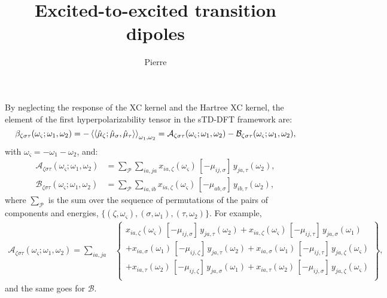 \documentclass[11pt,a4paper]{article}
\title{Excited-to-excited transition dipoles}
\author{Pierre}
\begin{document}
\maketitle

By neglecting the response of the XC kernel and the Hartree XC kernel, the element of the first hyperpolarizability tensor in the sTD-DFT framework are:
\begin{equation}
\beta_{\zeta\sigma\tau}(\omega_\varsigma;\omega_1,\omega_2) = -\braket{\braket{\hat\mu_\zeta;\hat\mu_\sigma,\hat\mu_\tau}}_{\omega_1,\omega_2} = \mathcal A_{\zeta\sigma\tau}(\omega_\varsigma;\omega_1,\omega_2) - \mathcal B_{\zeta\sigma\tau}(\omega_\varsigma;\omega_1,\omega_2), \label{eq:beta}
\end{equation}
with $\omega_\varsigma = -\omega_1 - \omega_2$, and:
\begin{align}
	\mathcal A_{\zeta\sigma\tau}(\omega_\varsigma;\omega_1,\omega_2) &= \sum_{\mathcal P} \sum_{ia,ja} x_{ia,\zeta}(\omega_\varsigma)\,[-\mu_{ij,\sigma}]\,y_{ja,\tau}(\omega_2), \label{eq:A}\\
	\mathcal B_{\zeta\sigma\tau}(\omega_\varsigma;\omega_1,\omega_2) &= \sum_{\mathcal P} \sum_{ia,ib} x_{ia,\zeta}(\omega_\varsigma)\,[-\mu_{ab,\sigma}]\,y_{ib,\tau}(\omega_2), \label{eq:B}
\end{align}
where $\sum_{\mathcal P}$ is the sum over the sequence of permutations of the pairs of components and energies, $\{(\zeta,\omega_\varsigma), (\sigma, \omega_1), (\tau,\omega_2)\}$. For example,
	\begin{align*}
	\mathcal A_{\zeta\sigma\tau}(\omega_\varsigma;\omega_1,\omega_2) = \sum_{ia,ja}& \left\{\begin{array}{l}
		x_{ia,\zeta}(\omega_\varsigma)\,[-\mu_{ij,\sigma}]\,y_{ja,\tau}(\omega_2) + x_{ia,\zeta}(\omega_\varsigma)\,[-\mu_{ij,\tau}]\,y_{ja,\sigma}(\omega_1)\\
		+x_{ia,\sigma}(\omega_1)\,[-\mu_{ij,\zeta}]\,y_{ja,\tau}(\omega_2) + x_{ia,\sigma}(\omega_1)\,[-\mu_{ij,\tau}]\,y_{ja,\zeta}(\omega_\varsigma) \\
		+x_{ia,\tau}(\omega_2)\,[-\mu_{ij,\zeta}]\,y_{ja,\sigma}(\omega_1) + x_{ia,\tau}(\omega_2)\,[-\mu_{ij,\sigma}]\,y_{ja,\zeta}(\omega_\varsigma)\\
	\end{array}\right\},
\end{align*}
and the same goes for $\mathcal B$.
\end{document}
